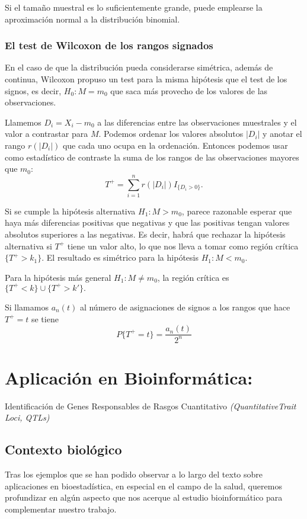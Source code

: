 \documentclass[a4paper,12pt]{article}
\begin{document}
Si el tamaño muestral es lo suficientemente grande, puede emplearse la aproximación normal a la distribución binomial.

\subsubsection{El test de Wilcoxon de los rangos signados}
En el caso de que la distribución pueda considerarse simétrica, además de continua, Wilcoxon propuso un test para la misma hipótesis que el test de los signos, es decir, $H_0:M =m_0$ que saca más provecho de los valores de las observaciones.

Llamemos $D_i=X_i - m_0$ a las diferencias entre las observaciones muestrales y el valor a contrastar para $M$. Podemos ordenar los valores absolutos $|D_i|$ y anotar el rango $r(|D_i|)$ que cada uno ocupa en la ordenación.  Entonces podemos usar como estadístico de contraste la suma de los rangos de las observaciones mayores que $m_0$:
$$T^+ = \sum_{i =1}^{n} r(|D_i|)I_{\{D_i>0\}}.$$

Si se cumple la hipótesis alternativa $H_1:M>m_0$, parece razonable esperar que haya más diferencias positivas que negativas y que las positivas tengan valores absolutos superiores a las negativas. Es decir, habrá que rechazar la hipótesis alternativa si $T^+$ tiene un valor alto, lo que nos lleva a tomar como región crítica $\{T^+ > k_1\}$. El resultado es simétrico para la hipótesis $H_1:M<m_0$.

Para la hipótesis más general $H_1: M \neq m_0$, la región crítica es $\{ T^+<k\}\cup\{T^+ >k'\}.$

Si llamamos $a_n(t)$ al número de asignaciones de signos a los rangos que hace $T^+=t$ se tiene $$P\{T^+ = t\}=\frac{a_n(t)}{2^n}$$ 





\section{Aplicación en Bioinformática:}
\large{Identificación de Genes Responsables de Rasgos Cuantitativo \textit{(QuantitativeTrait Loci, QTLs)}}
\normalsize{}
\subsection{Contexto biológico}
Tras los ejemplos que se han podido observar a lo largo del texto sobre aplicaciones en bioestadística, en especial en el campo de la salud, queremos profundizar en algún aspecto que nos acerque al estudio bioinformático para complementar nuestro trabajo.
\end{document}
